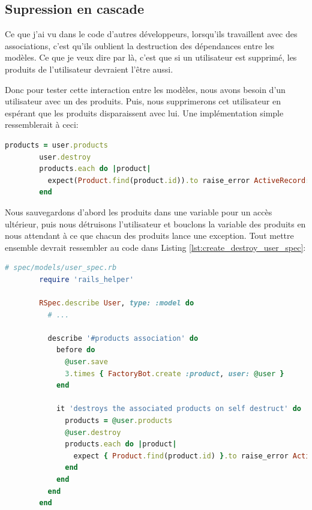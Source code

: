 \documentclass[]{report}
\begin{document}
    \subsection{Supression en cascade}

      Ce que j'ai vu dans le code d'autres développeurs, lorsqu'ils travaillent avec des associations, c'est qu'ils oublient la destruction des dépendances entre les modèles. Ce que je veux dire par là, c'est que si un utilisateur est supprimé, les produits de l'utilisateur devraient l'être aussi.

      Donc pour tester cette interaction entre les modèles, nous avons besoin d'un utilisateur avec un des produits. Puis, nous supprimerons cet utilisateur en espérant que les produits disparaissent avec lui. Une implémentation simple ressemblerait à ceci:

      \begin{scriptsize}
        \begin{lstlisting}[language=ruby]
        products = user.products
        user.destroy
        products.each do |product|
          expect(Product.find(product.id)).to raise_error ActiveRecord::RecordNotFound
        end
        \end{lstlisting}
      \end{scriptsize}

      Nous sauvegardons d'abord les produits dans une variable pour un accès ultérieur, puis nous détruisons l'utilisateur et bouclons la variable des produits en nous attendant à ce que chacun des produits lance une exception. Tout mettre ensemble devrait ressembler au code dans Listing \ref{lst:create_destroy_user_spec}:

      \begin{scriptsize}
        \begin{lstlisting}[language=ruby, caption={Test de suppression des produits liés aux utilisateurs}, label={lst:create_destroy_user_spec}]
        # spec/models/user_spec.rb
        require 'rails_helper'

        RSpec.describe User, type: :model do
          # ...

          describe '#products association' do
            before do
              @user.save
              3.times { FactoryBot.create :product, user: @user }
            end

            it 'destroys the associated products on self destruct' do
              products = @user.products
              @user.destroy
              products.each do |product|
                expect { Product.find(product.id) }.to raise_error ActiveRecord::RecordNotFound
              end
            end
          end
        end
        \end{lstlisting}
      \end{scriptsize}
\end{document}
